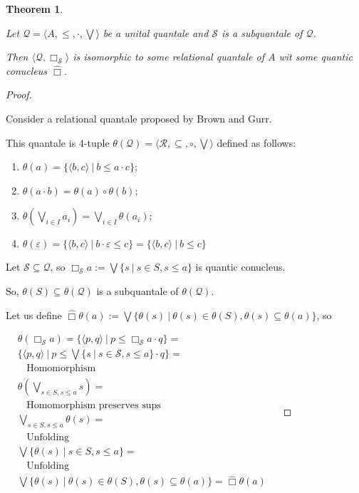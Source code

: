\documentclass[a4paper]{article}
\theoremstyle{defin}
\theoremstyle{theorem}
\newtheorem{theorem}{Theorem}
\theoremstyle{prop}
\theoremstyle{lemma}
\theoremstyle{ex}
\theoremstyle{col}
\begin{document}
\begin{theorem}
  $ $

  Let $\mathcal{Q} = \langle A, \leq, \cdot, \bigvee \rangle$ be a unital quantale and $\mathcal{S}$ is a subquantale of $\mathcal{Q}$.

  Then $\langle \mathcal{Q}, \Box_{\mathcal{S}} \rangle$ is isomorphic to some relational quantale of $A$
  wit some quantic conucleus $\hat{\Box}$.
\end{theorem}

\begin{proof}
$ $

  Consider a relational quantale proposed by Brown and Gurr.

  This quantale is 4-tuple $\theta(\mathcal{Q}) = \langle \mathcal{R}, \subseteq, \circ, \bigvee \rangle$ defined as follows:
  \begin{enumerate}
    \item $\theta(a) = \{ \langle b, c \rangle \: | \: b \leq a \cdot c \}$;
    \item $\theta(a \cdot b) = \theta(a) \circ \theta(b)$;
    \item $\theta(\bigvee \limits_{i \in I} a_i) = \bigvee \limits_{i \in I} \theta(a_i)$;
    \item $\theta(\varepsilon) = \{ \langle b, c \rangle \: | \: b \cdot \varepsilon \leq c \} = \{ \langle b, c \rangle \: | \: b \leq c \}$
  \end{enumerate}

  Let $\mathcal{S} \subseteq \mathcal{Q}$, so $\Box_{\mathcal{S}} a := \bigvee \{ s \: | \: s \in S, s \leq a \}$ is quantic conucleus.

  So, $\theta(S) \subseteq \theta(\mathcal{Q})$ is a subquantale of $\theta(\mathcal{Q})$.

  Let us define $\hat{\Box} \theta(a) := \bigvee \{ \theta(s) \: | \: \theta(s) \in \theta(S), \theta(s) \subseteq \theta(a) \}$, so

  $\begin{array}{lll}
  &\theta(\Box_{\mathcal{S}} a) = \{ \langle p, q \rangle \: | \: p \leq \Box_{\mathcal{S}} a \cdot q \} = &\\
  &\{ \langle p, q \rangle \: | \: p \leq \bigvee \{ s \: | \: s \in \mathcal{S}, s \leq a \} \cdot q \} = &\\
  &\:\:\:\: \text{Homomorphism}& \\
  &\theta(\bigvee_{s \in S, s \leq a} s) = & \\
  &\:\:\:\: \text{Homomorphism preserves sups}& \\
  &\bigvee_{s \in S, s \leq a} \theta(s) = & \\
  &\:\:\:\: \text{Unfolding}& \\
  &\bigvee \{ \theta(s) \: | \: s \in S, s \leq a \} = & \\
  &\:\:\:\: \text{Unfolding}& \\
  &\bigvee \{ \theta(s) \: | \: \theta(s) \in \theta(S), \theta(s) \subseteq \theta(a) \} = \hat{\Box} \theta(a)& \\
  \end{array}$


\end{proof}
\end{document}
